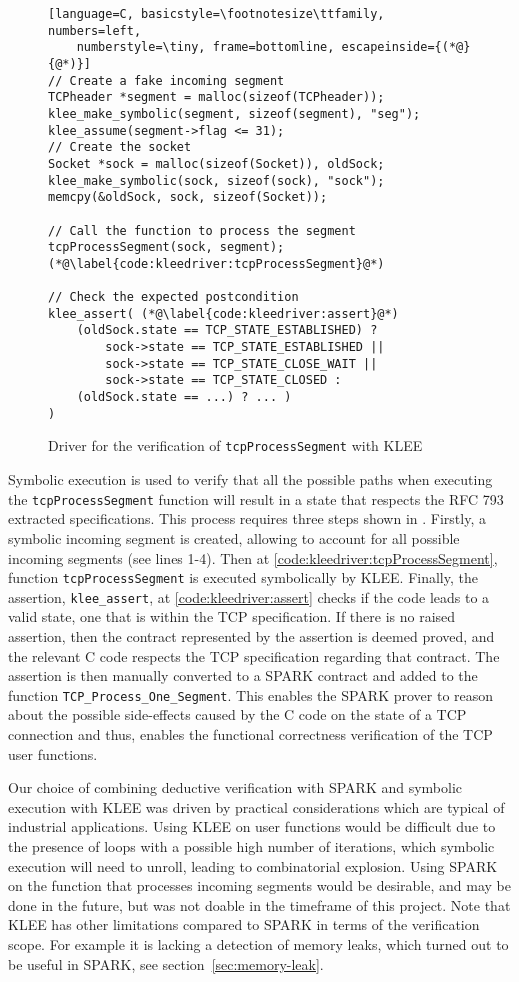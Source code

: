 \documentclass[conference]{IEEEtran}
\def\spark#1{\lstinline[language=Ada]{#1}}
\begin{document}
\begin{figure}
\begin{lstlisting}[language=C, basicstyle=\footnotesize\ttfamily, numbers=left,
    numberstyle=\tiny, frame=bottomline, escapeinside={(*@}{@*)}]
// Create a fake incoming segment
TCPheader *segment = malloc(sizeof(TCPheader));
klee_make_symbolic(segment, sizeof(segment), "seg");
klee_assume(segment->flag <= 31);
// Create the socket
Socket *sock = malloc(sizeof(Socket)), oldSock;
klee_make_symbolic(sock, sizeof(sock), "sock");
memcpy(&oldSock, sock, sizeof(Socket));

// Call the function to process the segment
tcpProcessSegment(sock, segment); (*@\label{code:kleedriver:tcpProcessSegment}@*)

// Check the expected postcondition
klee_assert( (*@\label{code:kleedriver:assert}@*)
    (oldSock.state == TCP_STATE_ESTABLISHED) ?
        sock->state == TCP_STATE_ESTABLISHED ||
        sock->state == TCP_STATE_CLOSE_WAIT ||
        sock->state == TCP_STATE_CLOSED :
    (oldSock.state == ...) ? ... )
)
\end{lstlisting}
\caption{Driver for the verification of \lstinline[language=C]{tcpProcessSegment}
with KLEE}
\label{code:kleedriver}
\end{figure}

Symbolic execution is used to verify that all the possible paths when executing the \spark{tcpProcessSegment} function will result in a state that respects the RFC 793 extracted specifications. This process requires three steps shown in . Firstly, a symbolic incoming segment is created, allowing to account for all possible incoming segments (see lines 1-4). Then at \cref{code:kleedriver:tcpProcessSegment}, function \texttt{tcpProcessSegment} is executed symbolically by KLEE. Finally, the assertion, \texttt{klee\_assert}, at \cref{code:kleedriver:assert} checks if the code leads to a valid state, one that is within the TCP specification. If there is no raised assertion, then the contract represented by the assertion is deemed proved, and the relevant C code respects the TCP specification regarding that contract. The assertion is then manually converted to a SPARK contract and added to the function \spark{TCP_Process_One_Segment}. This enables the SPARK prover to reason about the possible side-effects caused by the C code on the state of a TCP connection and thus, enables the functional correctness verification of the TCP user functions.

Our choice of combining deductive verification with SPARK and symbolic execution with KLEE was driven by practical considerations which are typical of industrial applications. Using KLEE on user functions would be difficult due to the presence of loops with a possible high number of iterations, which symbolic execution will need to unroll, leading to combinatorial explosion. Using SPARK on the function that processes incoming segments would be desirable, and may be done in the future, but was not doable in the timeframe of this project. Note that KLEE has other limitations compared to SPARK in terms of the verification scope. For example it is lacking a detection of memory leaks, which turned out to be useful in SPARK, see section~\ref{sec:memory-leak}.
\end{document}
